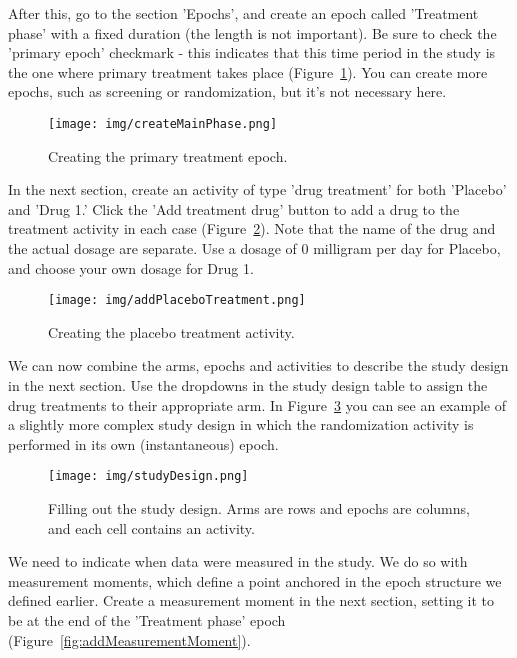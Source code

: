 \documentclass[12pt]{article}
\begin{document}
After this, go to the section 'Epochs', and create an epoch called 'Treatment phase' with a fixed duration (the length is not important). 
Be sure to check the 'primary epoch' checkmark - this indicates that this time period in the study is the one where primary treatment takes place (Figure~\ref{fig:createMainPhase}). 
You can create more epochs, such as screening or randomization, but it's not necessary here.

\begin{figure}[!htbp]
  \centering
  \texttt{[image: img/createMainPhase.png]}
  \caption{Creating the primary treatment epoch.}
\label{fig:createMainPhase}
\end{figure}

In the next section, create an activity of type 'drug treatment' for both 'Placebo' and 'Drug 1.' Click the 'Add treatment drug' button to add a drug to the treatment activity in each case (Figure~\ref{fig:addPlaceboTreatment}). Note that the name of the drug and the actual dosage are separate. Use a dosage of 0 milligram per day for Placebo, and choose your own dosage for Drug 1.

\begin{figure}[!htbp]
  \centering
  \texttt{[image: img/addPlaceboTreatment.png]}
  \caption{Creating the placebo treatment activity.}
\label{fig:addPlaceboTreatment}
\end{figure}

We can now combine the arms, epochs and activities to describe the study design in the next section. Use the dropdowns in the study design table to assign the drug treatments to their appropriate arm. In Figure~\ref{fig:studyDesign} you can see an example of a slightly more complex study design in which the randomization activity is performed in its own (instantaneous) epoch.

\begin{figure}[!htbp]
  \centering
  \texttt{[image: img/studyDesign.png]}
  \caption{Filling out the study design. Arms are rows and epochs are columns, and each cell contains an activity.}
\label{fig:studyDesign}
\end{figure}

We need to indicate when data were measured in the study. We do so with measurement moments, which define a point anchored in the epoch structure we defined earlier. Create a measurement moment in the next section, setting it to be at the end of the 'Treatment phase' epoch (Figure~\ref{fig:addMeasurementMoment}).
\end{document}
